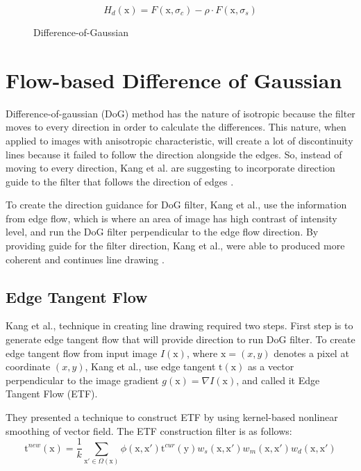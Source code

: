 \begin{equation}
	H_{d}(\mbox{x}) = F(\mbox{x},\sigma_{c}) - \rho\cdot F(\mbox{x},\sigma_{s})
\end{equation}

\begin{figure}[H]
	\centering
	\caption{Difference-of-Gaussian}\label{fig:DoG}
\end{figure}

\section{Flow-based Difference of Gaussian} 
Difference-of-gaussian (DoG) method has the nature of isotropic because the filter moves to every direction in order to calculate the differences. This nature, when applied to images with anisotropic characteristic, will create a lot of discontinuity lines because it failed to follow the direction alongside the edges. So, instead of moving to every direction, Kang et al. are suggesting to incorporate direction guide to the filter that follows the direction of edges \cite{kang07}.

To create the direction guidance for DoG filter, Kang et al., use the information from edge flow, which is where an area of image has high contrast of intensity level, and run the DoG filter perpendicular to the edge flow direction. By providing guide for the filter direction, Kang et al., were able to produced more coherent and continues line drawing \cite{kang07}. 


\subsection{Edge Tangent Flow} 
Kang et al., technique in creating line drawing required two steps. First step is to generate edge tangent flow that will provide direction to run DoG filter. To create edge tangent flow from input image $ I(\mbox{x}) $, where $ \mbox{x} = (x,y)$ denotes a pixel at coordinate $(x,y)$, Kang et al., use edge tangent $\mbox{t}(\mbox{x}) $ as a vector perpendicular to the image gradient $ g(\mbox{x}) = \nabla I(\mbox{x})$, and called it Edge Tangent Flow (ETF). 

They presented a technique to construct ETF by using kernel-based nonlinear smoothing of vector field. The ETF construction filter is as follows:
\begin{equation}
	\mbox{t} ^{new}(\mbox{x} ) = \frac{1}{k} \sum_{\mathrm{x}' \in \Omega (\mathrm{x})} \phi (\mbox{x},\mbox{x}') \mbox{t} ^{cur} (\mbox{y}) w_s(\mbox{x},\mbox{x}') w_m(\mbox{x},\mbox{x}') w_d(\mbox{x},\mbox{x}')
\end{equation}

